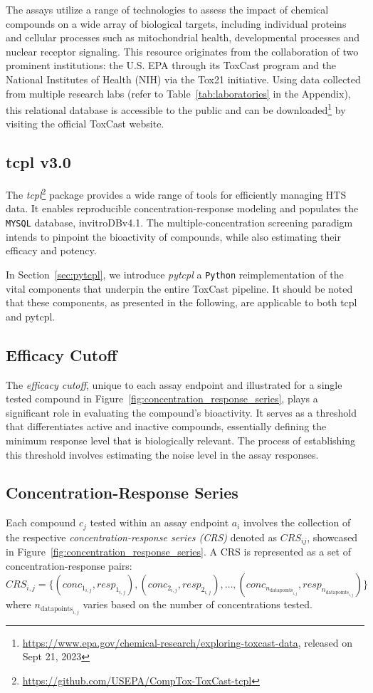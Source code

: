 The assays utilize a range of technologies to assess the impact of chemical compounds on a wide array of biological targets, including individual proteins and cellular processes such as mitochondrial health, developmental processes and nuclear receptor signaling. This resource originates from the collaboration of two prominent institutions: the  U.S. EPA through its ToxCast program and the National Institutes of Health (NIH) via the Tox21 initiative. Using data collected from multiple research labs (refer to Table~\ref{tab:laboratories} in the Appendix), this relational database is accessible to the public and can be downloaded\footnote{\url{https://www.epa.gov/chemical-research/exploring-toxcast-data}, released on Sept 21, 2023} by visiting the official ToxCast website.

\subsection{tcpl v3.0}
The \emph{tcpl}\footnote{\url{https://github.com/USEPA/CompTox-ToxCast-tcpl}} package provides a wide range of tools for efficiently managing HTS data. It enables reproducible concentration-response modeling and populates the \texttt{MYSQL} database, invitroDBv4.1. The multiple-concentration screening paradigm intends to pinpoint the bioactivity of compounds, while also estimating their efficacy and potency. 

In Section~\ref{sec:pytcpl}, we introduce \emph{pytcpl} a \texttt{Python} reimplementation of the vital components that underpin the entire ToxCast pipeline. It should be noted that these components, as presented in the following, are applicable to both tcpl and pytcpl.

\subsection{Efficacy Cutoff}
The \emph{efficacy cutoff}, unique to each assay endpoint and illustrated for a single tested compound in Figure~\ref{fig:concentration_response_series}, plays a significant role in evaluating the compound's bioactivity. It serves as a threshold that differentiates active and inactive compounds, essentially defining the minimum response level that is biologically relevant. The process of establishing this threshold involves estimating the noise level in the assay responses.

\subsection{Concentration-Response Series}
Each compound $c_j$ tested within an assay endpoint $a_i$ involves the collection of the respective \emph{concentration-response series (CRS)} denoted as $CRS_{ij}$, showcased in Figure~\ref{fig:concentration_response_series}. A CRS is represented as a set of concentration-response pairs: 
\[ CRS_{i,j} = \{(conc_{1_{i,j}}, resp_{1_{i,j}}), (conc_{2_{i,j}}, resp_{2_{i,j}}), \dots, (conc_{n_{\text{datapoints}_{i,j}}}, resp_{n_{\text{datapoints}_{i,j}}})\} \] where $n_{\text{datapoints}_{i,j}}$ varies based on the number of concentrations tested. 

